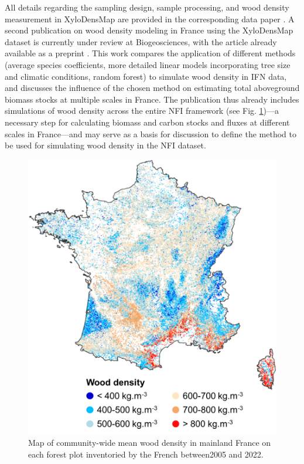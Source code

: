 All details regarding the sampling design, sample processing, and wood density measurement in Xylo\-Dens\-Map are provided in the corresponding data paper \parencite{Cuny2025}. A second publication on wood density modeling in France using the Xylo\-Dens\-Map dataset is currently under review at Biogeosciences, with the article already available as a preprint \parencite{Cuny2025_a}. This work compares the application of different methods (average species coefficients, more detailed linear models incorporating tree size and climatic conditions, random forest) to simulate wood density in IFN data, and discusses the influence of the chosen method on estimating total aboveground biomass stocks at multiple scales in France. The publication thus already includes simulations of wood density across the entire NFI framework (see Fig.  \ref{fig::map_density})---a necessary step for calculating biomass and carbon stocks and fluxes at different scales in France---and may serve as a basis for discussion to define the method to be used for simulating wood density in the NFI dataset.
\begin{figure}[h]
	\centering
	\includegraphics[scale = 0.35]{./Figures/map_density.png}
	\caption{Map of community-wide mean wood density in mainland France on each forest plot inventoried by the French \NFI{} between2005 and 2022.\label{fig::map_density}}
\end{figure}
